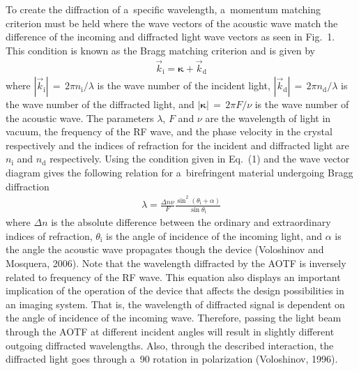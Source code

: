 \documentclass[amtd, online, hvmath]{copernicus}
\begin{document}
To create the diffraction of a~specific wavelength, a~momentum matching
criterion must be held where the wave vectors of the acoustic wave match the
difference of the incoming and diffracted light wave vectors as seen in
Fig.~1. This condition is known as the Bragg matching criterion and is given
by
\begin{align}
\vec{k}_{\mathrm{i}}=\boldsymbol{\kappa} +\vec{k}_{\mathrm{d}}
\end{align}
where $\left| \vec{k}_{\mathrm{i}} \right|\,=\,2\pi
n_{\mathrm{i}}/\lambda$ is the wave number of the incident light,
$\left| \vec{k}_{\mathrm{d}} \right|\,=\,2\pi n_{\mathrm{d}}/\lambda$
is the wave number of the diffracted light, and $\left|
  \boldsymbol{\kappa} \right|\,=\,2\pi F/\nu$ is the wave number of
the acoustic wave. The parameters $\lambda$, $F$ and $\nu$ are the
wavelength of light in vacuum, the frequency of the RF wave, and the
phase velocity in the crystal respectively and the indices of
refraction for the incident and diffracted light are $n_{\mathrm{i}}$
and $n_{\mathrm{d}}$ respectively. Using the condition given in
Eq.~(1) and the wave vector diagram gives the following relation for
a~birefringent material undergoing Bragg diffraction
\begin{align}
\lambda =\frac{\Delta n\nu} {F}\frac{\sin^{2}\left(\theta
_{\mathrm{i}}+\alpha \right)}{\sin \theta_{\mathrm{i}}}
\end{align}
where $\Delta n$ is the absolute difference between the
ordinary and extraordinary indices of refraction,
$\theta_{\mathrm{i}}$ is the angle of incidence of the incoming light,
and $\alpha$ is the angle the acoustic wave propagates though the
device (Voloshinov and Mosquera, 2006). Note that the wavelength
diffracted by the AOTF is inversely related to frequency of the RF
wave. This equation also displays an important implication of the
operation of the device that affects the design possibilities in an
imaging system. That is, the wavelength of diffracted signal is
dependent on the angle of incidence of the incoming wave. Therefore,
passing the light beam through the AOTF at different incident angles
will result in slightly different outgoing diffracted
wavelengths. Also, through the described interaction, the diffracted
light goes through a~90{\degree} rotation in polarization (Voloshinov,
1996).
\end{document}

